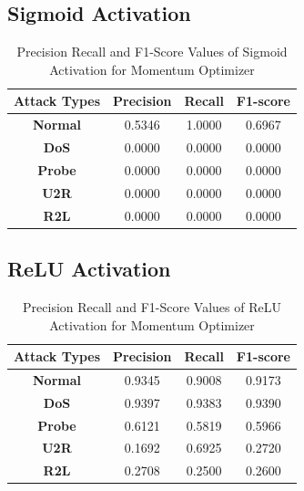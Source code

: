 \documentclass[12pt, a4paper]{report}
\begin{document}
\begin{appendices}
	 \subsection{Sigmoid Activation}
   	\begin{table}[h]
	\centering
	\captionsetup{justification=centering,margin=2cm}
	\begin{tabular}{|c|c|c|c|}
	\hline
	\textbf{Attack Types} & \textbf{Precision} & \textbf{Recall} & \textbf{F1-score} \\ \hline
	\textbf{Normal}       & 0.5346             & 1.0000          & 0.6967            \\ \hline
	\textbf{DoS}          & 0.0000             & 0.0000          & 0.0000            \\ \hline
	\textbf{Probe}        & 0.0000             & 0.0000          & 0.0000            \\ \hline
	\textbf{U2R}          & 0.0000             & 0.0000          & 0.0000            \\ \hline
	\textbf{R2L}          & 0.0000             & 0.0000          & 0.0000            \\ \hline
	\end{tabular}
	\caption{Precision Recall and F1-Score Values of Sigmoid Activation for Momentum Optimizer}
	\label{classification sigmoid Momentum tflearn}
	\end{table} 
	
	\subsection{ReLU Activation}
	 \begin{table}[h]
		\centering
		\captionsetup{justification=centering,margin=2cm}
		\begin{tabular}{|c|c|c|c|}
		\hline
		\textbf{Attack Types} & \textbf{Precision} & \textbf{Recall} & \textbf{F1-score} \\ \hline
		\textbf{Normal}       & 0.9345             & 0.9008          & 0.9173            \\ \hline
		\textbf{DoS}          & 0.9397             & 0.9383          & 0.9390            \\ \hline
		\textbf{Probe}        & 0.6121             & 0.5819          & 0.5966            \\ \hline
		\textbf{U2R}          & 0.1692             & 0.6925          & 0.2720            \\ \hline
		\textbf{R2L}          & 0.2708             & 0.2500          & 0.2600            \\ \hline
		\end{tabular}
		\caption{Precision Recall and F1-Score Values of ReLU Activation for Momentum Optimizer}
		\label{classification relu Momentum tflearn}
		\end{table} 
	\clearpage

\end{appendices}
\end{document}
